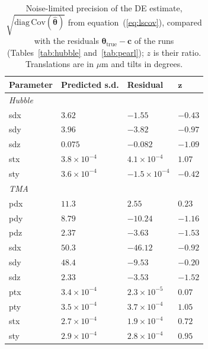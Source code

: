 \begin{table}
\centering
\caption[Noise-limited precision of the DE estimate compared with the run residuals.]{Noise-limited precision of the DE estimate, $\sqrt{\mathrm{diag}\,\mathrm{Cov}(\hat{\boldsymbol{\theta}})}$ from equation~(\ref{eq:lscov}), compared with the residuals $\boldsymbol{\theta}_{\mathrm{true}}-\mathbf{c}$ of the runs (Tables~\ref{tab:hubble} and~\ref{tab:pearl}); $z$ is their ratio. Translations are in $\mu$m and tilts in degrees.}
\label{tab:noise_params}
\begin{tabular}{llll}
\hline
\textbf{Parameter} & \textbf{Predicted s.d.} & \textbf{Residual} & $\boldsymbol{z}$ \\
\hline
\multicolumn{4}{l}{\textit{Hubble}} \\
sdx & $3.62$ & $-1.55$ & $-0.43$ \\
sdy & $3.96$ & $-3.82$ & $-0.97$ \\
sdz & $0.075$ & $-0.082$ & $-1.09$ \\
stx & $3.8\times10^{-4}$ & $4.1\times10^{-4}$ & $1.07$ \\
sty & $3.6\times10^{-4}$ & $-1.5\times10^{-4}$ & $-0.42$ \\
\hline
\multicolumn{4}{l}{\textit{TMA}} \\
pdx & $11.3$ & $2.55$ & $0.23$ \\
pdy & $8.79$ & $-10.24$ & $-1.16$ \\
pdz & $2.37$ & $-3.63$ & $-1.53$ \\
sdx & $50.3$ & $-46.12$ & $-0.92$ \\
sdy & $48.4$ & $-9.53$ & $-0.20$ \\
sdz & $2.33$ & $-3.53$ & $-1.52$ \\
ptx & $3.4\times10^{-4}$ & $2.3\times10^{-5}$ & $0.07$ \\
pty & $3.5\times10^{-4}$ & $3.7\times10^{-4}$ & $1.05$ \\
stx & $2.7\times10^{-4}$ & $1.9\times10^{-4}$ & $0.72$ \\
sty & $2.9\times10^{-4}$ & $2.8\times10^{-4}$ & $0.95$ \\
\hline
\end{tabular}
\end{table}

